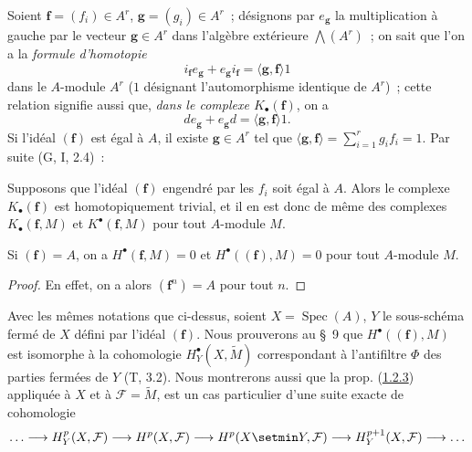 \begin{env}[1.1.7]
\label{III.1.1.7-fr}
Soient $\mathbf f=(f_i)\in A^r$, $\mathbf g=(g_i)\in A^r$~; désignons par
$e_{\mathbf g}$ la multiplication à gauche par le vecteur
$\mathbf g\in A^r$ dans l'algèbre extérieure $\bigwedge(A^r)$~; on sait que
l'on a la \emph{formule d'homotopie}
\begin{equation}
\label{III.1.1.7.1-fr}
\tag{1.1.7.1}
i_{\mathbf f}e_{\mathbf g}+e_{\mathbf g}i_{\mathbf f}
=\langle\mathbf g,\mathbf f\rangle 1
\end{equation}
dans le $A$-module $A^r$ ($1$ désignant l'automorphisme identique de $A^r$)~;
cette relation signifie aussi que, \emph{dans le complexe
$K_\bullet(\mathbf f)$}, on a
\begin{equation}
\label{III.1.1.7.2-fr}
\tag{1.1.7.2}
de_{\mathbf g}+e_{\mathbf g}d=\langle\mathbf g,\mathbf f\rangle 1.
\end{equation}
Si l'idéal $(\mathbf f)$ est égal à $A$, il existe $\mathbf g\in A^r$ tel que
$\langle\mathbf g,\mathbf f\rangle=\sum_{i=1}^r g_if_i=1$. Par suite
(G, I, 2.4)~:
\end{env}

\begin{proposition}[1.1.8]
\label{III.1.1.8-fr}
Supposons que l'idéal $(\mathbf f)$ engendré par les $f_i$ soit égal à $A$.
Alors le complexe $K_\bullet(\mathbf f)$ est homotopiquement trivial, et il en
est donc de même des complexes $K_\bullet(\mathbf f,M)$ et
$K^\bullet(\mathbf f,M)$ pour tout $A$-module $M$.
\end{proposition}

\begin{corollary}[1.1.9]
\label{III.1.1.9-fr}
Si $(\mathbf f)=A$, on a $H^\bullet(\mathbf f,M)=0$ et
$H^\bullet((\mathbf f),M)=0$ pour tout $A$-module $M$.
\end{corollary}

\begin{proof}
En effet, on a alors $(\mathbf f^n)=A$ pour tout $n$.
\end{proof}

\begin{remark}[1.1.10]
\label{III.1.1.10-fr}
Avec les mêmes notations que ci-dessus, soient $X=\operatorname{Spec}(A)$,
$Y$ le sous-schéma fermé de $X$ défini par l'idéal $(\mathbf f)$. Nous
prouverons au \S~9 que $H^\bullet((\mathbf f),M)$ est isomorphe à la
cohomologie $H_Y^\bullet(X,\widetilde M)$ correspondant à l'antifiltre $\Phi$
des parties fermées de $Y$ (T, 3.2). Nous montrerons aussi que la prop.
(\hyperref[III.1.2.3-fr]{1.2.3}) appliquée à $X$ et à
$\mathcal F=\widetilde M$, est un cas particulier d'une suite exacte de
cohomologie
\[
\ldots\longrightarrow H_Y^p(X,\mathcal F)\longrightarrow H^p(X,\mathcal F)
\longrightarrow H^p(X\setmin Y,\mathcal F)\longrightarrow H_Y^{p+1}(X,\mathcal F)
\longrightarrow\ldots
\]
\end{remark}

